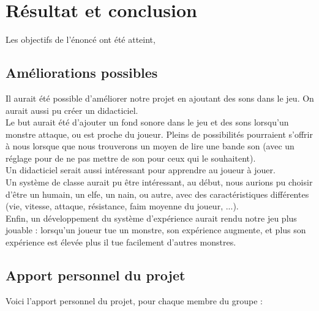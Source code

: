 \documentclass[11pt]{report}
\begin{document}
\chapter{Résultat et conclusion}

	Les objectifs de l'énoncé ont été atteint, 
	
	\section{Améliorations possibles}
	
	Il aurait été possible d'améliorer notre projet en ajoutant des sons dans le jeu. On aurait aussi pu créer un didacticiel. \\
	Le but aurait été d'ajouter un fond sonore dans le jeu et des sons lorsqu'un monstre attaque, ou est proche du joueur. Pleins de possibilités pourraient s'offrir à nous lorsque que nous trouverons un moyen de lire une bande son (avec un réglage pour de ne pas mettre de son pour ceux qui le souhaitent). \\
	Un didacticiel serait aussi intéressant pour apprendre au joueur à jouer.\\
	Un système de classe aurait pu être intéressant, au début, nous aurions pu choisir d'être un humain, un elfe, un nain, ou autre, avec des caractéristiques différentes (vie, vitesse, attaque, résistance, faim moyenne du joueur, ...).\\
	Enfin, un développement du système d'expérience aurait rendu notre jeu plus jouable : lorsqu'un joueur tue un monstre, son expérience augmente, et plus son expérience est élevée plus il tue facilement d'autres monstres.
	
	\section{Apport personnel du projet}
	
	Voici l'apport personnel du projet, pour chaque membre du groupe :
	
\end{document}
